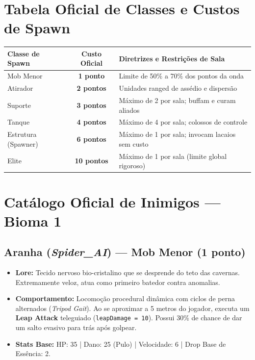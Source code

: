 \documentclass[a4paper,12pt]{report}
\begin{document}
\section{Tabela Oficial de Classes e Custos de Spawn}
\begin{center}
\begin{tabular}{|l|c|l|}
    \hline
    \textbf{Classe de Spawn} & \textbf{Custo Oficial} & \textbf{Diretrizes e Restrições de Sala} \\
    \hline
    Mob Menor            & \textbf{1 ponto}   & Limite de 50\% a 70\% dos pontos da onda \\
    Atirador             & \textbf{2 pontos}  & Unidades ranged de assédio e dispersão \\
    Suporte              & \textbf{3 pontos}  & Máximo de 2 por sala; buffam e curam aliados \\
    Tanque               & \textbf{4 pontos}  & Máximo de 4 por sala; colossos de controle \\
    Estrutura (Spawner)  & \textbf{6 pontos}  & Máximo de 1 por sala; invocam lacaios sem custo \\
    Elite                & \textbf{10 pontos} & Máximo de 1 por sala (limite global rigoroso) \\
    \hline
\end{tabular}
\end{center}

\section{Catálogo Oficial de Inimigos --- Bioma 1}

\subsection{Aranha (\textit{Spider\_AI}) --- Mob Menor (1 ponto)}
\begin{itemize}
    \item \textbf{Lore:} Tecido nervoso bio-cristalino que se desprende do teto das cavernas. Extremamente veloz, atua como primeiro batedor contra anomalias.
    \item \textbf{Comportamento:} Locomoção procedural dinâmica com ciclos de perna alternados (\textit{Tripod Gait}). Ao se aproximar a 5 metros do jogador, executa um \textbf{Leap Attack} teleguiado (\texttt{leapDamage = 10}). Possui 30\% de chance de dar um salto evasivo para trás após golpear.
    \item \textbf{Stats Base:} HP: 35 | Dano: 25 (Pulo) | Velocidade: 6 | Drop Base de Essência: 2.
\end{itemize}
\end{document}
